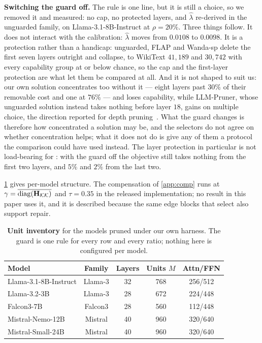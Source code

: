 \textbf{Switching the guard off.} The rule is one line, but it is still a choice, so we removed it and
measured: no cap, no protected layers, and $\hat\lambda$ re-derived in the unguarded family, on
Llama-3.1-8B-Instruct at $\rho{=}20\%$. Three things follow. It does not interact with the calibration:
$\hat\lambda$ moves from $0.0108$ to $0.0098$. It is a protection rather than a handicap: unguarded,
FLAP and Wanda-sp delete the first seven layers outright and collapse, to WikiText $41{,}189$ and
$30{,}742$ with every capability group at or below chance, so the cap and the first-layer protection are
what let them be compared at all. And it is not shaped to suit us: our own solution concentrates too
without it --- eight layers past $30\%$ of their removable cost and one at $76\%$ --- and loses
capability, while LLM-Pruner, whose unguarded solution instead takes nothing before layer $18$, gains on
multiple choice, the direction reported for depth
pruning~\citep{men2024shortgpt,kim2024shortened}. What the guard changes is therefore how concentrated
a solution may be, and the selectors do not agree on whether concentration helps; what it does not do is
give any of them a protocol the comparison could have used instead. The layer protection in particular
is not load-bearing for \method: with the guard off the objective still takes nothing from the first two
layers, and $5\%$ and $2\%$ from the last two.

\cref{tab:hparam} gives per-model structure. The compensation of \cref{app:comp} runs at
$\gamma=\overline{\mathrm{diag}(\mathbf{H}_{\mathcal K\mathcal K})}$ and $\tau=0.35$ in the released
implementation; no result in this paper uses it, and it is described because the same edge blocks that
select also support repair.
\begin{table}[htbp]
\centering\caption{\textbf{Unit inventory} for the models pruned under our own harness. The guard
is one rule for every row and every ratio; nothing here is configured per model.}\label{tab:hparam}\footnotesize
\setlength{\tabcolsep}{6pt}
\begin{tabular}{l cccc}
\toprule
\textbf{Model} & Family & Layers & Units $M$ & Attn/FFN\\
\midrule
Llama-3.1-8B-Instruct & Llama-3 & 32 & 768 & 256/512\\
Llama-3.2-3B & Llama-3 & 28 & 672 & 224/448\\
Falcon3-7B & Falcon3 & 28 & 560 & 112/448\\
Mistral-Nemo-12B & Mistral & 40 & 960 & 320/640\\
Mistral-Small-24B & Mistral & 40 & 960 & 320/640\\
\bottomrule
\end{tabular}
\end{table}
